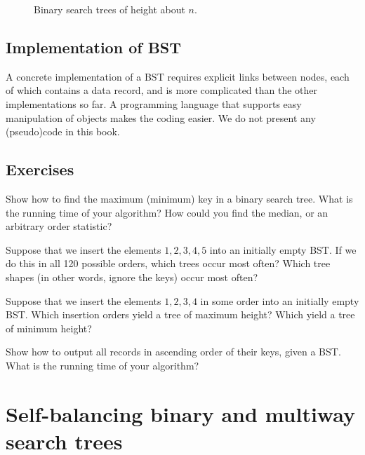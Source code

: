 \begin{figure}[htb!]
\centerline{
}
\caption{\label{btr-bala} Binary search trees of height about $n$.}
\end{figure}


\subsection{Implementation of BST}

A concrete implementation of a BST requires explicit links between nodes, each 
of which contains a data record, and is more complicated than the other 
implementations so far. A programming language that supports easy manipulation of
objects makes the coding easier. We do not present any (pseudo)code in this book.

\subsection*{Exercises}

\begin{Exercise}\label{exr:bst-min-max-med}
Show how to find the maximum (minimum) key in a binary search tree. What is the 
running time of your algorithm? How could you find the median, or an arbitrary 
order statistic?
\end{Exercise}

\begin{Exercise} \label{bst-dist}
Suppose that we insert the elements $1,2,3,4,5$ into an initially 
empty BST. If we do this in all 120 possible orders, which trees occur most often? 
Which tree shapes (in other words, ignore the keys) occur most often?
\end{Exercise}

\begin{Exercise} \label{exr:bst-extreme}

Suppose that we insert the elements $1,2,3,4$ in some order into an initially 
empty BST. Which insertion orders yield a tree of maximum height? Which yield a 
tree of minimum height?  
\end{Exercise}

\begin{Exercise}\label{exr:bst-sort}
Show how to output all records in ascending order of their keys, given a BST. 
What is the running time of your algorithm? 
\end{Exercise}

\section{Self-balancing binary and multiway search trees}
\label{sec:balanced}

